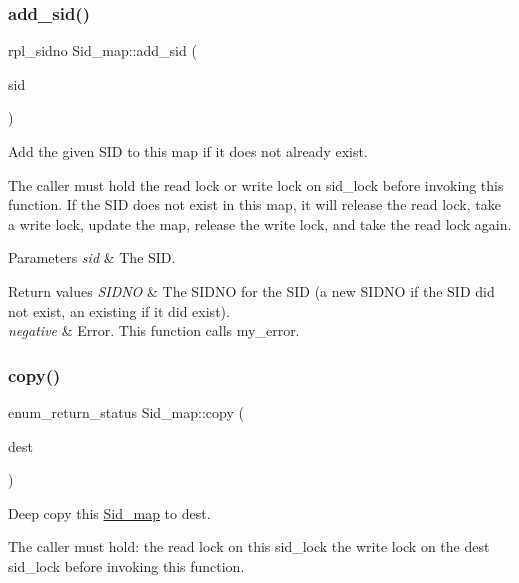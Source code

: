 \subsubsection{\texorpdfstring{add\+\_\+sid()}{add\_sid()}}
{\footnotesize\ttfamily rpl\+\_\+sidno Sid\+\_\+map\+::add\+\_\+sid (\begin{DoxyParamCaption}\item[{const rpl\+\_\+sid \&}]{sid }\end{DoxyParamCaption})}

Add the given S\+ID to this map if it does not already exist.

The caller must hold the read lock or write lock on sid\+\_\+lock before invoking this function. If the S\+ID does not exist in this map, it will release the read lock, take a write lock, update the map, release the write lock, and take the read lock again.


\begin{DoxyParams}{Parameters}
{\em sid} & The S\+ID. \\
\hline
\end{DoxyParams}

\begin{DoxyRetVals}{Return values}
{\em S\+I\+D\+NO} & The S\+I\+D\+NO for the S\+ID (a new S\+I\+D\+NO if the S\+ID did not exist, an existing if it did exist). \\
\hline
{\em negative} & Error. This function calls my\+\_\+error. \\
\hline
\end{DoxyRetVals}
\mbox{\label{classSid__map_aa02acc6896576b6a7f54fb55c1e359cd}} 
\subsubsection{\texorpdfstring{copy()}{copy()}}
{\footnotesize\ttfamily enum\+\_\+return\+\_\+status Sid\+\_\+map\+::copy (\begin{DoxyParamCaption}\item[{\mbox{\hyperlink{classSid__map}{Sid\+\_\+map}} $\ast$}]{dest }\end{DoxyParamCaption})}

Deep copy this \mbox{\hyperlink{classSid__map}{Sid\+\_\+map}} to dest.

The caller must hold\+: the read lock on this sid\+\_\+lock the write lock on the dest sid\+\_\+lock before invoking this function.



